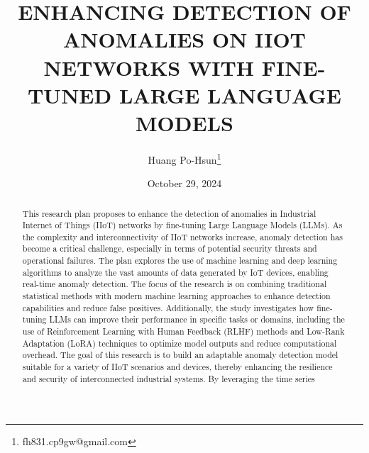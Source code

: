 \documentclass[usenatbib]{tjaa}
\title[Enhancing Detection of Anomalies on IIoT Networks]{ENHANCING DETECTION OF ANOMALIES ON IIOT NETWORKS WITH FINE-TUNED LARGE LANGUAGE MODELS}%
\author[H. Author \others]{%
Huang Po-Hsun\thanks{fh831.cp9gw@gmail.com}
}%
\date{October 29, 2024}
\begin{document}
\label{firstpage}
\pagerange{\pageref{firstpage}--\pageref{lastpage}}

\begin{abstract}%
%
This research plan proposes to enhance the detection of anomalies in Industrial Internet of Things (IIoT) networks
by fine-tuning Large Language Models (LLMs). As the complexity and interconnectivity of IIoT networks increase,
anomaly detection has become a critical challenge, especially in terms of potential security threats
and operational failures. The plan explores the use of machine learning and deep learning algorithms to analyze
the vast amounts of data generated by IoT devices, enabling real-time anomaly detection. The focus of the research
is on combining traditional statistical methods with modern machine learning approaches to enhance detection capabilities
and reduce false positives. Additionally, the study investigates how fine-tuning LLMs can improve their performance in
specific tasks or domains, including the use of Reinforcement Learning with Human Feedback (RLHF) methods and Low-Rank
Adaptation (LoRA) techniques to optimize model outputs and reduce computational overhead. The goal of this research
is to build an adaptable anomaly detection model suitable for a variety of IIoT scenarios and devices,
thereby enhancing the resilience and security of interconnected industrial systems. By leveraging the time series

\end{abstract}
\end{document}
